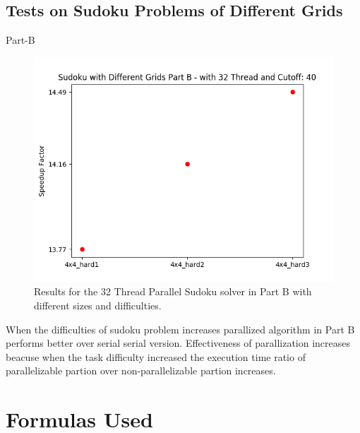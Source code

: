 \documentclass{article}
\newcommand\tab[1][0.5cm]{\hspace*{#1}}
\begin{document}
\subsection{Tests on Sudoku Problems of Different Grids}
\begin{description}
\item[Part-B]
\end{description} 
\begin{figure}[!htb]
    \centering
    \includegraphics[width=1\linewidth]{./img/grids_part_2_B.png}
    \caption{Results for the 32 Thread Parallel Sudoku solver in Part B with different sizes and difficulties.}
\end{figure}
\tab When the difficulties of sudoku problem increases parallized algorithm in Part B performs better 
over serial serial version. Effectiveness of parallization increases beacuse when the task difficulty
increased the execution time ratio of parallelizable partion over non-parallelizable partion increases. 


\section{Formulas Used}
\end{document}
